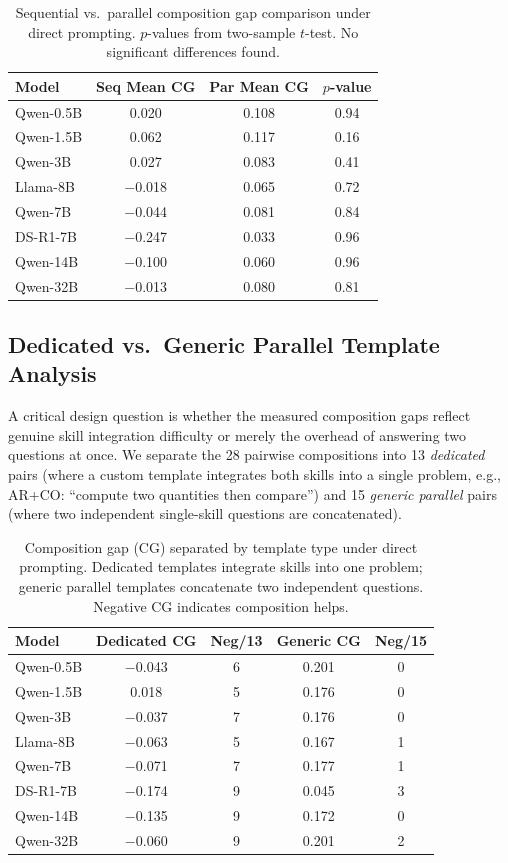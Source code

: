 \documentclass{article}
\begin{document}
\begin{table}[t]
\centering
\caption{Sequential vs.\ parallel composition gap comparison under direct prompting. $p$-values from two-sample $t$-test. No significant differences found.}
\label{tab:seq_par}
\begin{tabular}{lccc}
\toprule
Model & Seq Mean CG & Par Mean CG & $p$-value \\
\midrule
Qwen-0.5B & 0.020 & 0.108 & 0.94 \\
Qwen-1.5B & 0.062 & 0.117 & 0.16 \\
Qwen-3B & 0.027 & 0.083 & 0.41 \\
Llama-8B & $-$0.018 & 0.065 & 0.72 \\
Qwen-7B & $-$0.044 & 0.081 & 0.84 \\
DS-R1-7B & $-$0.247 & 0.033 & 0.96 \\
Qwen-14B & $-$0.100 & 0.060 & 0.96 \\
Qwen-32B & $-$0.013 & 0.080 & 0.81 \\
\bottomrule
\end{tabular}
\end{table}

\subsection{Dedicated vs.\ Generic Parallel Template Analysis}
\label{sec:template_type_analysis}

A critical design question is whether the measured composition gaps reflect genuine skill integration difficulty or merely the overhead of answering two questions at once. We separate the 28 pairwise compositions into 13 \emph{dedicated} pairs (where a custom template integrates both skills into a single problem, e.g., AR+CO: ``compute two quantities then compare'') and 15 \emph{generic parallel} pairs (where two independent single-skill questions are concatenated).

\begin{table}[t]
\centering
\caption{Composition gap (CG) separated by template type under direct prompting. Dedicated templates integrate skills into one problem; generic parallel templates concatenate two independent questions. Negative CG indicates composition helps.}
\label{tab:template_type}
\begin{tabular}{lcccc}
\toprule
Model & Dedicated CG & Neg/13 & Generic CG & Neg/15 \\
\midrule
Qwen-0.5B & $-$0.043 & 6 & 0.201 & 0 \\
Qwen-1.5B & 0.018 & 5 & 0.176 & 0 \\
Qwen-3B & $-$0.037 & 7 & 0.176 & 0 \\
Llama-8B & $-$0.063 & 5 & 0.167 & 1 \\
Qwen-7B & $-$0.071 & 7 & 0.177 & 1 \\
DS-R1-7B & $-$0.174 & 9 & 0.045 & 3 \\
Qwen-14B & $-$0.135 & 9 & 0.172 & 0 \\
Qwen-32B & $-$0.060 & 9 & 0.201 & 2 \\
\bottomrule
\end{tabular}
\end{table}
\end{document}
